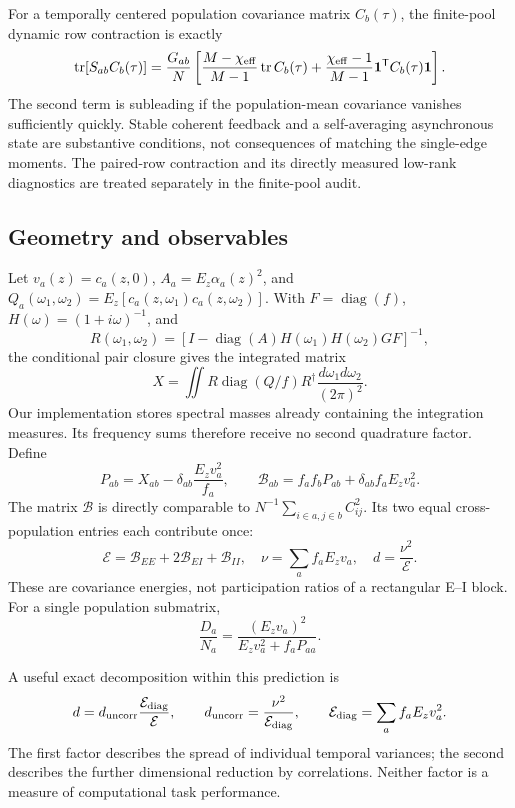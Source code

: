 For a temporally centered population covariance matrix \(C_b(\tau)\), the
finite-pool dynamic row contraction is exactly
\[
 \operatorname{tr}[S_{ab}C_b(\tau)]
 =\frac{G_{ab}}N\left[
 \frac{M-\chi_{\rm eff}}{M-1}\operatorname{tr}C_b(\tau)
 +\frac{\chi_{\rm eff}-1}{M-1}
 {\boldsymbol 1}^{\mathsf T}C_b(\tau){\boldsymbol 1}\right].
\]
The second term is subleading if the population-mean covariance vanishes
sufficiently quickly. Stable coherent feedback and a self-averaging
asynchronous state are substantive conditions, not consequences of matching
the single-edge moments. The paired-row contraction and its directly
measured low-rank diagnostics are treated separately in the finite-pool audit.

\subsection{Geometry and observables}

Let \(v_a(z)=c_a(z,0)\),
\(A_a=E_z\alpha_a(z)^2\), and
\(Q_a(\omega_1,\omega_2)=
E_z[c_a(z,\omega_1)c_a(z,\omega_2)]\).
With \(F=\operatorname{diag}(f)\),
\(H(\omega)=(1+i\omega)^{-1}\), and
\[
 R(\omega_1,\omega_2)=
 \left[I-\operatorname{diag}(A)H(\omega_1)H(\omega_2)GF\right]^{-1},
\]
the conditional pair closure gives the integrated matrix
\[
 X=\iint R\operatorname{diag}(Q/f)R^\dagger
       \frac{d\omega_1d\omega_2}{(2\pi)^2}.
\]
Our implementation stores spectral masses already containing the integration
measures. Its frequency sums therefore receive no second quadrature factor.
Define
\[
 P_{ab}=X_{ab}-\delta_{ab}\frac{E_zv_a^2}{f_a},
 \qquad
 \mathcal B_{ab}=f_af_b P_{ab}+
                  \delta_{ab} f_aE_zv_a^2.
\]
The matrix \(\mathcal B\) is directly comparable to
\(N^{-1}\sum_{i\in a,j\in b}C_{ij}^2\).
Its two equal cross-population entries each contribute once:
\[
 \mathcal E=\mathcal B_{EE}+2\mathcal B_{EI}+\mathcal B_{II},
 \quad
 \nu=\sum_af_aE_zv_a,
 \quad
 d=\frac{\nu^2}{\mathcal E}.
\]
These are covariance energies, not participation ratios of a rectangular
E--I block. For a single population submatrix,
\[
 \frac{D_a}{N_a}
 =\frac{(E_zv_a)^2}{E_zv_a^2+f_aP_{aa}}.
\]

A useful exact decomposition within this prediction is
\[
 d=d_{\rm uncorr}
       \frac{\mathcal E_{\rm diag}}{\mathcal E},
 \qquad
 d_{\rm uncorr}=\frac{\nu^2}{\mathcal E_{\rm diag}},
 \qquad
 \mathcal E_{\rm diag}=\sum_af_aE_zv_a^2.
\]
The first factor describes the spread of individual temporal variances;
the second describes the further dimensional reduction by correlations.
Neither factor is a measure of computational task performance.

